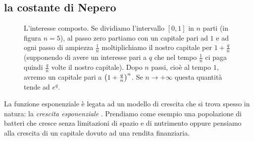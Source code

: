 \subsection{la costante di Nepero}

\begin{figure}
  \begin{center}
  \end{center}
  \caption{L'interesse composto.
  Se dividiamo l'intervallo $[0,1]$
  in $n$ parti (in figura $n=5$), al passo zero
  partiamo con un capitale pari ad $1$ e ad ogni
  passo di ampiezza $\frac 1 n$ moltiplichiamo
  il nostro capitale per $1+\frac q n$ (supponendo
  di avere un interesse pari a $q$ che
  nel tempo $\frac 1 n$ ci paga quindi $\frac q n$
  volte il nostro capitale).
  Dopo
  $n$ passi, cioè al tempo $1$, avremo
  un capitale pari a ${\left( 1+\frac q n \right)}^n$.
  Se $n\to+\infty$ questa quantità tende ad $e^q$.}
  \label{fig:nepero}
\end{figure}


La funzione esponenziale è legata ad un modello di crescita che si trova spesso
in natura: la \emph{crescita esponenziale}%
%
.
Prendiamo come esempio una popolazione di batteri che cresce senza
limitazioni di spazio e di nutrimento oppure
pensiamo alla crescita di un capitale dovuto ad una rendita finanziaria.

